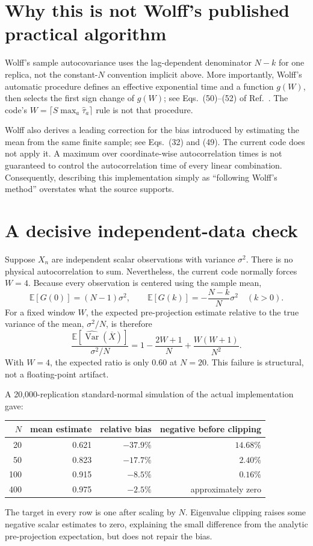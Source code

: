 \documentclass[11pt]{article}
\newcommand{\Var}{\operatorname{Var}}
\begin{document}
\section{Why this is not Wolff's published practical algorithm}

Wolff's sample autocovariance uses the lag-dependent denominator \(N-k\)
for one replica, not the constant-\(N\) convention implicit above. More
importantly, Wolff's automatic procedure defines an effective exponential
time and a function \(g(W)\), then selects the first sign change of \(g(W)\);
see Eqs.~(50)--(52) of Ref.~\cite{Wolff2004}. The code's
\(W=\lceil S\max_a\widehat\tau_a\rceil\) rule is not that procedure.

Wolff also derives a leading correction for the bias introduced by estimating
the mean from the same finite sample; see Eqs.~(32) and (49). The current code
does not apply it. A maximum over coordinate-wise autocorrelation times is
not guaranteed to control the autocorrelation time of every linear
combination. Consequently, describing this implementation simply as
``following Wolff's method'' overstates what the source supports.

\section{A decisive independent-data check}

Suppose \(X_n\) are independent scalar observations with variance
\(\sigma^2\). There is no physical autocorrelation to sum. Nevertheless,
the current code normally forces \(W=4\). Because every observation is
centered using the sample mean,
\[
  \mathbb E[G(0)]=(N-1)\sigma^2,
  \qquad
  \mathbb E[G(k)]=-\frac{N-k}{N}\sigma^2\quad(k>0).
\]
For a fixed window \(W\), the expected pre-projection estimate relative to
the true variance of the mean, \(\sigma^2/N\), is therefore
\[
  \frac{\mathbb E[\widehat{\Var}(\overline X)]}{\sigma^2/N}
  =
  1-\frac{2W+1}{N}+\frac{W(W+1)}{N^2}.
\]
With \(W=4\), the expected ratio is only \(0.60\) at \(N=20\). This failure
is structural, not a floating-point artifact.

A 20,000-replication standard-normal simulation of the actual implementation
gave:
\begin{center}
\begin{tabular}{@{}rrrr@{}}
\toprule
\(N\) & mean estimate & relative bias & negative before clipping \\
\midrule
20  & 0.621 & \(-37.9\%\) & \(14.68\%\) \\
50  & 0.823 & \(-17.7\%\) & \( 2.40\%\) \\
100 & 0.915 & \( -8.5\%\) & \( 0.16\%\) \\
400 & 0.975 & \( -2.5\%\) & approximately zero \\
\bottomrule
\end{tabular}
\end{center}
The target in every row is one after scaling by \(N\). Eigenvalue clipping
raises some negative scalar estimates to zero, explaining the small
difference from the analytic pre-projection expectation, but does not repair
the bias.
\end{document}
